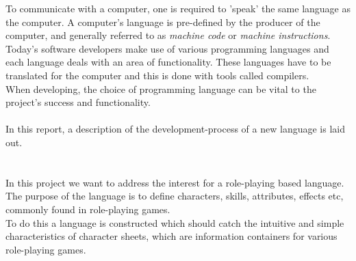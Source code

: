 
To communicate with a computer, one is required to 'speak' the same language as the computer. A computer's language is pre-defined by the producer of the computer, and generally referred to as \emph{machine code} or \emph{machine instructions}.\\
Today's software developers make use of various programming languages and each language deals with an area of functionality. These languages have to be translated for the computer and this is done with tools called compilers.\\
When developing, the choice of programming language can be vital to the project's success and functionality.\\\\
In this report, a description of the development-process of a new language is laid out.

\section{\langname{}}
In this project we want to address the interest for a role-playing based language. The purpose of the language is to define characters, skills, attributes, effects etc, commonly found in role-playing games.\\
To do this a language is constructed which should catch the intuitive and simple characteristics of character sheets, which are information containers for various role-playing games.


